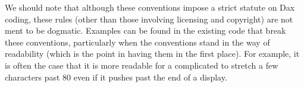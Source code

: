 We should note that although these conventions impose a strict statute on
Dax coding, these rules (other than those involving licensing and
copyright) are not ment to be dogmatic. Examples can be found in the
existing code that break these conventions, particularly when the
conventions stand in the way of readability (which is the point in having
them in the first place). For example, it is often the case that it is more
readable for a complicated  to stretch a few characters
past 80 even if it pushes past the end of a display.

